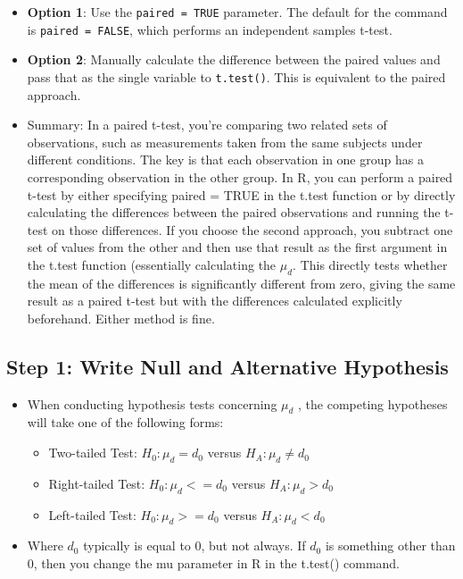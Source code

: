 \documentclass[
  letterpaper,
  DIV=11,
  numbers=noendperiod]{scrreprt}
\providecommand{\tightlist}{%
  \setlength{\itemsep}{0pt}\setlength{\parskip}{0pt}}\usepackage{longtable,booktabs,array}
\begin{document}
\begin{itemize}
\tightlist
\item
  \textbf{Option 1}: Use the \texttt{paired\ =\ TRUE} parameter. The
  default for the command is \texttt{paired\ =\ FALSE}, which performs
  an independent samples t-test.
\item
  \textbf{Option 2}: Manually calculate the difference between the
  paired values and pass that as the single variable to
  \texttt{t.test()}. This is equivalent to the paired approach.
\item
  Summary: In a paired t-test, you're comparing two related sets of
  observations, such as measurements taken from the same subjects under
  different conditions. The key is that each observation in one group
  has a corresponding observation in the other group. In R, you can
  perform a paired t-test by either specifying paired = TRUE in the
  t.test function or by directly calculating the differences between the
  paired observations and running the t-test on those differences. If
  you choose the second approach, you subtract one set of values from
  the other and then use that result as the first argument in the t.test
  function (essentially calculating the \(\mu_d\). This directly tests
  whether the mean of the differences is significantly different from
  zero, giving the same result as a paired t-test but with the
  differences calculated explicitly beforehand. Either method is fine.
\end{itemize}

\subsection{Step 1: Write Null and Alternative
Hypothesis}\label{step-1-write-null-and-alternative-hypothesis}

\begin{itemize}
\tightlist
\item
  When conducting hypothesis tests concerning \(\mu_d\) , the competing
  hypotheses will take one of the following forms:

  \begin{itemize}
  \tightlist
  \item
    Two-tailed Test: \(H_0: \mu_d  = d_0\) versus
    \(H_A: \mu_d \neq  d_0\)
  \item
    Right-tailed Test: \(H_0: \mu_d <= d_0\) versus \(H_A: \mu_d>  d_0\)
  \item
    Left-tailed Test: \(H_0: \mu_d >= d_0\) versus \(H_A: \mu_d< d_0\)
  \end{itemize}
\item
  Where \(d_0\) typically is equal to 0, but not always. If \(d_0\) is
  something other than 0, then you change the mu parameter in R in the
  t.test() command.
\end{itemize}
\end{document}
